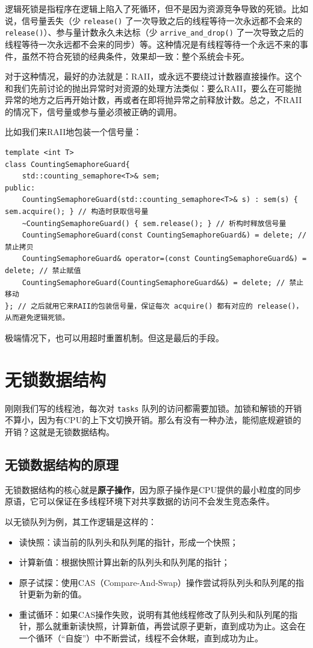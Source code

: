 逻辑死锁是指程序在逻辑上陷入了死循环，但不是因为资源竞争导致的死锁。比如说，信号量丢失（少 \verb|release()| 了一次导致之后的线程等待一次永远都不会来的 \verb|release()|）、参与量计数永久未达标（少 \verb|arrive_and_drop()| 了一次导致之后的线程等待一次永远都不会来的同步）等。这种情况是有线程等待一个永远不来的事件，虽然不符合死锁的经典条件，效果却一致：整个系统会卡死。

对于这种情况，最好的办法就是：RAII，或永远不要绕过计数器直接操作。这个和我们先前讨论的抛出异常时对资源的处理方法类似：要么RAII，要么在可能抛异常的地方之后再开始计数，再或者在即将抛异常之前释放计数。总之，不RAII的情况下，信号量或参与量必须被正确的调用。

比如我们来RAII地包装一个信号量：
\begin{verbatim}
template <int T>
class CountingSemaphoreGuard{
    std::counting_semaphore<T>& sem;
public:
    CountingSemaphoreGuard(std::counting_semaphore<T>& s) : sem(s) { sem.acquire(); } // 构造时获取信号量
    ~CountingSemaphoreGuard() { sem.release(); } // 析构时释放信号量
    CountingSemaphoreGuard(const CountingSemaphoreGuard&) = delete; // 禁止拷贝
    CountingSemaphoreGuard& operator=(const CountingSemaphoreGuard&) = delete; // 禁止赋值
    CountingSemaphoreGuard(CountingSemaphoreGuard&&) = delete; // 禁止移动
}; // 之后就用它来RAII的包装信号量，保证每次 acquire() 都有对应的 release()，从而避免逻辑死锁。
\end{verbatim}
极端情况下，也可以用超时重置机制。但这是最后的手段。

\section{无锁数据结构}

刚刚我们写的线程池，每次对 \verb|tasks| 队列的访问都需要加锁。加锁和解锁的开销不算小，因为有CPU的上下文切换开销。那么有没有一种办法，能彻底规避锁的开销？这就是无锁数据结构。

\subsection{无锁数据结构的原理}

无锁数据结构的核心就是\textbf{原子操作}，因为原子操作是CPU提供的最小粒度的同步原语，它可以保证在多线程环境下对共享数据的访问不会发生竞态条件。

以无锁队列为例，其工作逻辑是这样的：
\begin{itemize}
    \item 读快照：读当前的队列头和队列尾的指针，形成一个快照；
    \item 计算新值：根据快照计算出新的队列头和队列尾的指针；
    \item 原子试探：使用CAS（Compare-And-Swap）操作尝试将队列头和队列尾的指针更新为新的值。
    \item 重试循环：如果CAS操作失败，说明有其他线程修改了队列头和队列尾的指针，那么就重新读快照，计算新值，再尝试原子更新，直到成功为止。这会在一个循环（“自旋”）中不断尝试，线程不会休眠，直到成功为止。
\end{itemize}

